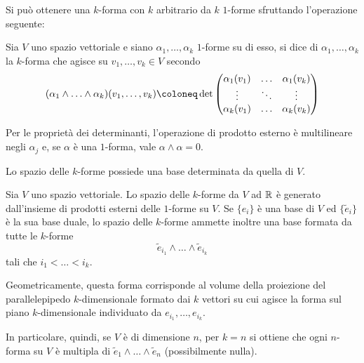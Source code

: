 Si può ottenere una $k$-forma con $k$ arbitrario da $k$ $1$-forme sfruttando l'operazione seguente:
\begin{definition}
  Sia $V$ uno spazio vettoriale e siano $\alpha_1, \ldots, \alpha_k$ $1$-forme su di esso, si dice  di $\alpha_1, \ldots, \alpha_k$ la $k$-forma che agisce su $v_1, \ldots, v_k \in V$ secondo \begin{equation}
  (\alpha_1 \wedge \ldots \wedge \alpha_k) (v_1, \ldots, v_k) \defeq \det \pmqty{\alpha_1 (v_1) & \ldots & \alpha_1 (v_k) \\
          \vdots & \ddots & \vdots \\
          \alpha_k (v_1) & \ldots & \alpha_k (v_k)}
  \end{equation} 
\end{definition}
\begin{remark}
  Per le proprietà dei determinanti, l'operazione di prodotto esterno è multilineare negli $\alpha_j$ e, se $\alpha$ è una $1$-forma, vale $\alpha \wedge \alpha = 0$.
\end{remark}

Lo spazio delle $k$-forme possiede una base determinata da quella di $V$.
\begin{theorem} \label{thm:kformBase}
  Sia $V$ uno spazio vettoriale. Lo spazio delle $k$-forme da $V$ ad $\mathbb{R}$ è generato dall'insieme di prodotti esterni delle $1$-forme su $V$. Se $\{e_i\} $ è una base di $V$ ed $\{\tilde{e}_i\} $ è la sua base duale, lo spazio delle $k$-forme ammette inoltre una base formata da tutte le $k$-forme \begin{equation}
    \tilde{e}_{i_1} \wedge \ldots \wedge \tilde{e}_{i_k}
  \end{equation}
  tali che $i_1 < \ldots < i_k$.
\end{theorem}
\begin{remark}
  Geometricamente, questa forma corrisponde al volume della proiezione del parallelepipedo $k$-dimensionale formato dai $k$ vettori su cui agisce la forma sul piano $k$-dimensionale individuato da $e_{i_1},\ldots,e_{i_k}$.
\end{remark}
\begin{remark} \label{rem:volumeForm}
  In particolare, quindi, se $V$ è di dimensione $n$, per $k=n$ si ottiene che ogni $n$-forma su $V$ è multipla di $\tilde{e}_1 \wedge \ldots \wedge \tilde{e}_n$ (possibilmente nulla).
\end{remark}

